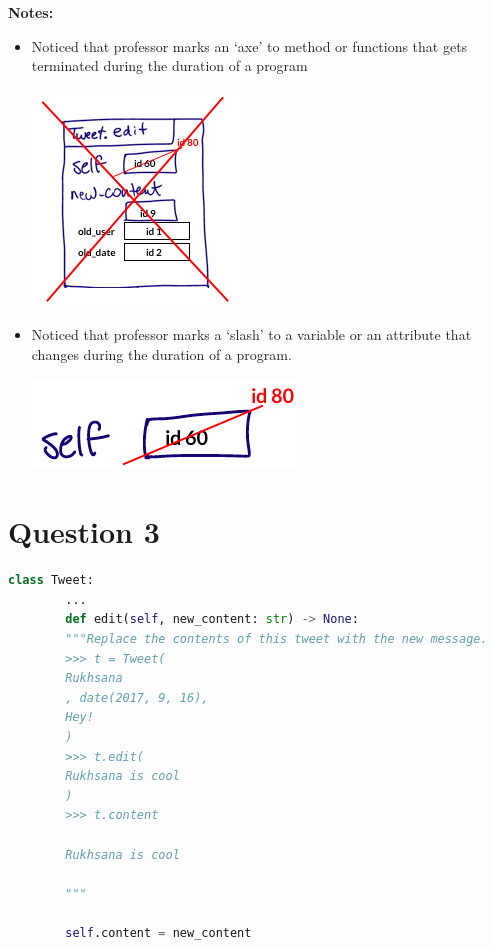 \documentclass[12pt]{article}
\begin{document}
\begin{itemize}
    \bigskip

    \textbf{Notes:}

    \begin{itemize}
        \item Noticed that professor marks an `axe' to method or functions that
        gets terminated during the duration of a program

        \begin{center}
        \includegraphics[width=0.3\linewidth]{images/worksheet_3_q2_note.png}
        \end{center}

        \item Noticed that professor marks a `slash' to a variable or an attribute that
        changes during the duration of a program.

        \begin{center}
        \includegraphics[width=0.3\linewidth]{images/worksheet_3_q2_note2.png}
        \end{center}
     \end{itemize}
\end{itemize}

\section*{Question 3}
\begin{lstlisting}[language=Python]
    class Tweet:
        ...
        def edit(self, new_content: str) -> None:
        """Replace the contents of this tweet with the new message.
        >>> t = Tweet(
        Rukhsana
        , date(2017, 9, 16),
        Hey!
        )
        >>> t.edit(
        Rukhsana is cool
        )
        >>> t.content

        Rukhsana is cool

        """

        self.content = new_content

\end{lstlisting}
\end{document}
